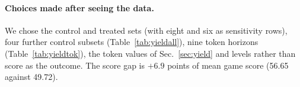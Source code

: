 \paragraph{Choices made after seeing the data.}
We chose the control and treated sets (with eight and six as sensitivity rows), four further control subsets (Table~\ref{tab:yieldall}), nine token horizons (Table~\ref{tab:yieldtok}), the token values of Sec.~\ref{sec:yield} and levels rather than score as the outcome. The score gap is $+6.9$ points of mean game score (56.65 against 49.72). %


